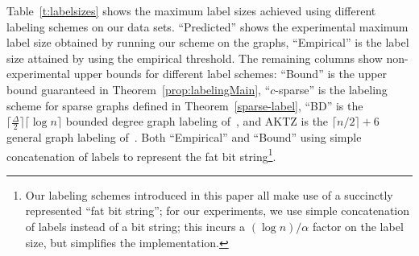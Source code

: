 Table~\ref{t:labelsizes}  shows  the maximum label sizes achieved using different labeling schemes on our data sets. ``Predicted'' shows the experimental maximum label size obtained by running our scheme on the graphs, ``Empirical'' is the label size attained by using the empirical threshold. The remaining columns show non-experimental upper bounds for different label schemes: ``Bound'' is the upper bound guaranteed in Theorem~\ref{prop:labelingMain}, ``$c$-sparse'' is  the labeling scheme for sparse graphs defined in Theorem~\ref{sparse-label}, ``BD'' is the $\lceil \frac{\Delta}{2} \rceil \lceil \log n\rceil$ bounded degree graph  labeling of~\cite{adjiashvili2014labeling}, and AKTZ is the $\lceil n/2\rceil+6$ general graph  labeling of~\cite{alstrup2014adjacency}.
Both ``Empirical'' and  ``Bound'' using simple concatenation of labels to represent the fat bit string\footnote{Our labeling schemes introduced in this paper all make use of a succinctly represented ``fat bit string''; for our experiments, we use simple concatenation of labels instead of a bit string; this incurs a $(\log n)/\alpha$ factor on the label size, but simplifies the implementation.}.
 

